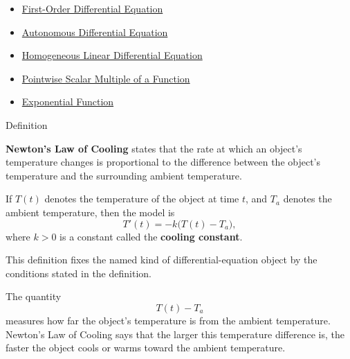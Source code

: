 \begin{dependencies}
\begin{itemize}
  \item \hyperref[def:ordinary-differential-equations-terminology-first-order-differential-equation]{First-Order Differential Equation}
  \item \hyperref[def:ordinary-differential-equations-terminology-autonomous-differential-equation]{Autonomous Differential Equation}
  \item \hyperref[def:ordinary-differential-equations-terminology-homogeneous-linear-differential-equation]{Homogeneous Linear Differential Equation}
  \item \hyperref[def:pointwise-scalar-multiple-of-a-function]{Pointwise Scalar Multiple of a Function}
  \item \hyperref[def:exponential]{Exponential Function}
\end{itemize}
\end{dependencies}


\begin{definitionbox}{Definition}
\begin{definition}
\label{def:ordinary-differential-equations-models-newton-s-law-of-cooling}
\textbf{Newton's Law of Cooling} states that the rate at which an object's temperature changes is proportional to the difference between the object's temperature and the surrounding ambient temperature.

If $T(t)$ denotes the temperature of the object at time $t$, and $T_a$ denotes the ambient temperature, then the model is
\[
T'(t)=-k\bigl(T(t)-T_a\bigr),
\]
where $k>0$ is a constant called the \textbf{cooling constant}.
\end{definition}
\end{definitionbox}

\begin{remark*}
This definition fixes the named kind of differential-equation object by the
conditions stated in the definition.
\end{remark*}

\begin{remark*}[Interpretation]
The quantity
\[
T(t)-T_a
\]
measures how far the object's temperature is from the ambient temperature. Newton's Law of Cooling says that the larger this temperature difference is, the faster the object cools or warms toward the ambient temperature.
\end{remark*}

